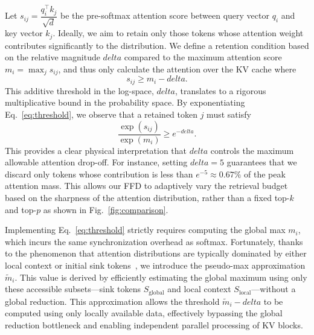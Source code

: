 \documentclass[]{mosi}
\def\bm#1{#1}%
\def\delta{delta}%
\theoremstyle{plain}
\theoremstyle{definition}
\theoremstyle{remark}
\begin{document}
Let $s_{ij} = \dfrac{\bm{q}_i^\top\bm{k}_j}{\sqrt{d}}$ be the pre-softmax attention score between query vector $\bm{q}_i$ and key vector $\bm{k}_j$. Ideally, we aim to retain only those tokens whose attention weight contributes significantly to the distribution. We define a retention condition based on the relative magnitude $\delta$ compared to the maximum attention score $m_i = \max_j s_{ij}$, and thus only calculate the attention over the KV cache where
\begin{equation}
\label{eq:threshold}
s_{ij} \ge m_i - \delta.
\end{equation}
This additive threshold in the log-space, $\delta$, translates to a rigorous multiplicative bound in the probability space. By exponentiating Eq.~\ref{eq:threshold}, we observe that a retained token $j$ must satisfy
\begin{equation}
\frac{\exp(s_{ij})}{\exp(m_i)} \ge e^{-\delta}.
\end{equation}
This provides a clear physical interpretation that $\delta$ controls the maximum allowable attention drop-off. For instance, setting $\delta=5$ guarantees that we discard only tokens whose contribution is less than $e^{-5} \approx 0.67\%$ of the peak attention mass. This allows our FFD to adaptively vary the retrieval budget based on the sharpness of the attention distribution, rather than a fixed top-$k$ and top-$p$ as shown in Fig.~\ref{fig:comparison}.

Implementing Eq.~\ref{eq:threshold} strictly requires computing the global max $m_i$, which incurs the same synchronization overhead as softmax. Fortunately, thanks to the phenomenon that attention distributions are typically dominated by either local context or initial sink tokens~\citep{xiao2023efficient}, we introduce the pseudo-max approximation $\tilde{m}_i$. This value is derived by efficiently estimating the global maximum using only these accessible subsets—sink tokens $S_\text{global}$ and local context $S_\text{local}$—without a global reduction. This approximation allows the threshold $\tilde{m}_i - \delta$ to be computed using only locally available data, effectively bypassing the global reduction bottleneck and enabling independent parallel processing of KV blocks.
\end{document}
